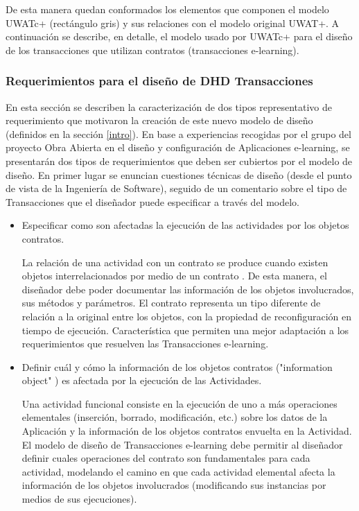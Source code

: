 De esta manera quedan conformados los elementos que componen el modelo UWATc+
(rectángulo gris) y sus relaciones con el modelo original UWAT+. A continuación
se describe, en detalle, el modelo usado por UWATc+ para el diseño de los
transacciones que utilizan contratos (transacciones e-learning). 


\subsubsection{Requerimientos para el diseño de DHD Transacciones}

En esta sección se describen la caracterización de dos tipos representativo de
requerimiento que motivaron la creación de este nuevo modelo de diseño
(definidos en la sección \ref{intro}). En base a experiencias recogidas por el
grupo del proyecto Obra Abierta en el diseño y configuración de Aplicaciones
e-learning, se presentarán dos tipos de requerimientos que deben ser cubiertos
por el modelo de diseño. En primer lugar se enuncian cuestiones técnicas de
diseño (desde el punto de vista de la Ingeniería de Software), seguido de un
comentario sobre el tipo de Transacciones que el diseñador puede especificar a
través del modelo.

\begin{itemize}

\item Especificar como son afectadas la ejecución de las actividades por los
objetos contratos. 


La relación de una actividad con un contrato se produce cuando existen objetos
interrelacionados por medio de un contrato \cite{fiadeiro}. De esta manera, el
diseñador debe poder documentar las información de los objetos involucrados, sus
métodos y parámetros. El contrato representa un tipo diferente de relación a la
original entre los objetos, con la propiedad de reconfiguración en tiempo de
ejecución. Característica que permiten una mejor adaptación a los requerimientos
que resuelven las Transacciones e-learning.

\item  Definir cuál y cómo la  información de los objetos contratos
("information object" \cite{informationobject}) es afectada por la ejecución de
las Actividades.


Una actividad funcional consiste en la ejecución de uno a más operaciones
elementales (inserción, borrado, modificación, etc.) sobre los datos de la
Aplicación y la información de los objetos contratos envuelta en la Actividad.
El modelo de diseño de Transacciones e-learning debe permitir al diseñador
definir cuales operaciones del contrato son fundamentales para cada actividad,
modelando el camino en que cada actividad elemental afecta la información de los
objetos involucrados (modificando sus instancias por medios de sus ejecuciones).
\end{itemize}


